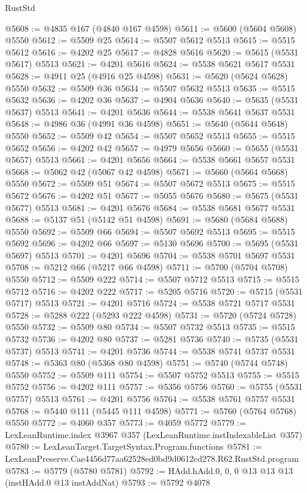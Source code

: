 \begin{lexlean}{RustStd}
\begin{coremodule}
@5608 := @4835 @167 (@4840 @167 @4598)
@5611 := @5600 (@5604 @5608) @5550
@5612 := @5509 @25
@5614 := @5507 @5612 @5513
@5615 := @5515 @5612
@5616 := @4202 @25
@5617 := @4828 @5616
@5620 := @5615 (@5531 @5617) @5513
@5621 := @4201 @5616
@5624 := @5538 @5621 @5617 @5531
@5628 := @4911 @25 (@4916 @25 @4598)
@5631 := @5620 (@5624 @5628) @5550
@5632 := @5509 @36
@5634 := @5507 @5632 @5513
@5635 := @5515 @5632
@5636 := @4202 @36
@5637 := @4904 @5636
@5640 := @5635 (@5531 @5637) @5513
@5641 := @4201 @5636
@5644 := @5538 @5641 @5637 @5531
@5648 := @4986 @36 (@4991 @36 @4598)
@5651 := @5640 (@5644 @5648) @5550
@5652 := @5509 @42
@5654 := @5507 @5652 @5513
@5655 := @5515 @5652
@5656 := @4202 @42
@5657 := @4979 @5656
@5660 := @5655 (@5531 @5657) @5513
@5661 := @4201 @5656
@5664 := @5538 @5661 @5657 @5531
@5668 := @5062 @42 (@5067 @42 @4598)
@5671 := @5660 (@5664 @5668) @5550
@5672 := @5509 @51
@5674 := @5507 @5672 @5513
@5675 := @5515 @5672
@5676 := @4202 @51
@5677 := @5055 @5676
@5680 := @5675 (@5531 @5677) @5513
@5681 := @4201 @5676
@5684 := @5538 @5681 @5677 @5531
@5688 := @5137 @51 (@5142 @51 @4598)
@5691 := @5680 (@5684 @5688) @5550
@5692 := @5509 @66
@5694 := @5507 @5692 @5513
@5695 := @5515 @5692
@5696 := @4202 @66
@5697 := @5130 @5696
@5700 := @5695 (@5531 @5697) @5513
@5701 := @4201 @5696
@5704 := @5538 @5701 @5697 @5531
@5708 := @5212 @66 (@5217 @66 @4598)
@5711 := @5700 (@5704 @5708) @5550
@5712 := @5509 @222
@5714 := @5507 @5712 @5513
@5715 := @5515 @5712
@5716 := @4202 @222
@5717 := @5205 @5716
@5720 := @5715 (@5531 @5717) @5513
@5721 := @4201 @5716
@5724 := @5538 @5721 @5717 @5531
@5728 := @5288 @222 (@5293 @222 @4598)
@5731 := @5720 (@5724 @5728) @5550
@5732 := @5509 @80
@5734 := @5507 @5732 @5513
@5735 := @5515 @5732
@5736 := @4202 @80
@5737 := @5281 @5736
@5740 := @5735 (@5531 @5737) @5513
@5741 := @4201 @5736
@5744 := @5538 @5741 @5737 @5531
@5748 := @5363 @80 (@5368 @80 @4598)
@5751 := @5740 (@5744 @5748) @5550
@5752 := @5509 @111
@5754 := @5507 @5752 @5513
@5755 := @5515 @5752
@5756 := @4202 @111
@5757 := @5356 @5756
@5760 := @5755 (@5531 @5757) @5513
@5761 := @4201 @5756
@5764 := @5538 @5761 @5757 @5531
@5768 := @5440 @111 (@5445 @111 @4598)
@5771 := @5760 (@5764 @5768) @5550
@5772 := @4060 @357
@5773 := @4059 @5772
@5779 := LexLeanRuntime.index @3967 @357 (LexLeanRuntime.instIndexableList @357)
@5780 := LexLeanTarget.TargetSyntax.Program.functions
@5781 := LexLeanPreserve.Cae4456d77aa62528ed0bd9d0612cd278.R62.RustStd.program
@5783 := @5779 (@5780 @5781)
@5792 := HAdd.hAdd.{0, 0, 0} @13 @13 @13 (instHAdd.{0} @13 instAddNat)
@5793 := @5792 @4078

\end{coremodule}
\end{lexlean}
